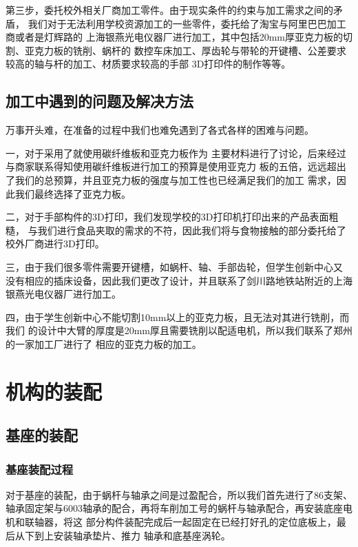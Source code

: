 {\songti 第三步，委托校外相关厂商加工零件。由于现实条件的约束与加工需求之间的矛盾，
我们对于无法利用学校资源加工的一些零件，委托给了淘宝与阿里巴巴加工商或者是灯辉路的
上海银燕光电仪器厂进行加工，其中包括20mm厚亚克力板的切割、亚克力板的铣削、蜗杆的
数控车床加工、厚齿轮与带轮的开键槽、公差要求较高的轴与杆的加工、材质要求较高的手部
3D打印件的制作等等。}


\subsection{加工中遇到的问题及解决方法}

{\songti 万事开头难，在准备的过程中我们也难免遇到了各式各样的困难与问题。}

{\songti 一，对于采用了就使用碳纤维板和亚克力板作为
主要材料进行了讨论，后来经过与商家联系得知使用碳纤维板进行加工的预算是使用亚克力
板的五倍，远远超出了我们的总预算，并且亚克力板的强度与加工性也已经满足我们的加工
需求，因此我们最终选择了亚克力板。}

{\songti 二，对于手部构件的3D打印，我们发现学校的3D打印机打印出来的产品表面粗糙，
与我们进行食品夹取的需求的不符，因此我们将与食物接触的部分委托给了校外厂商进行3D打印。}

{\songti 三，由于我们很多零件需要开键槽，如蜗杆、轴、手部齿轮，但学生创新中心又
没有相应的插床设备，因此我们更改了设计，并且联系了剑川路地铁站附近的上海银燕光电仪器厂进行加工。}

{\songti 四，由于学生创新中心不能切割10mm以上的亚克力板，且无法对其进行铣削，而我们
的设计中大臂的厚度是20mm厚且需要铣削以配适电机，所以我们联系了郑州的一家加工厂进行了
相应的亚克力板的加工。}


\section{机构的装配}

\subsection{基座的装配}

\subsubsection{基座装配过程}

{\songti 对于基座的装配，由于蜗杆与轴承之间是过盈配合，所以我们首先进行了86支架、
轴承固定架与6003轴承的配合，再将车削加工号的蜗杆与轴承配合，再安装底座电机和联轴器，将这
部分构件装配完成后一起固定在已经打好孔的定位底板上，最后从下到上安装轴承垫片、推力
轴承和底基座涡轮。}


